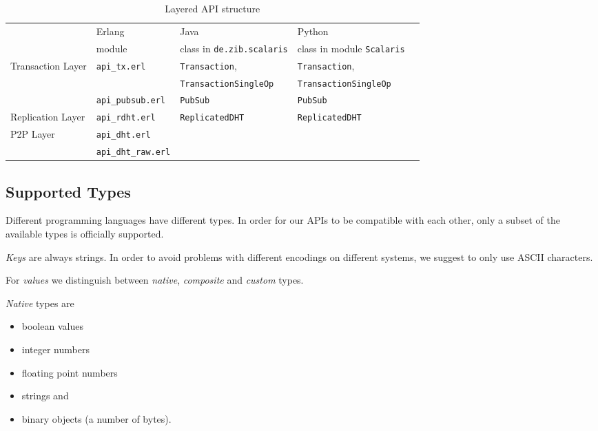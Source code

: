 \documentclass[a4paper]{scrreprt}
\newcommand{\code}[1]{\lstinline[basicstyle=\ttfamily]!#1!}
\begin{document}
\begin{table}
  \centering
    \begin{tabular}{lllll}
    \toprule
                      & Erlang                 & Java                         & Python                     \\
                      & \footnotesize{module}  & \footnotesize{class in \code{de.zib.scalaris}}%
                                                                              & \footnotesize{class in module \code{Scalaris}} \\
    \midrule
    Transaction Layer & \code{api_tx.erl}      & \code{Transaction},          & \code{Transaction},        \\
                      &                        & \code{TransactionSingleOp}  & \code{TransactionSingleOp} \\
                      & \code{api_pubsub.erl}  & \code{PubSub}                & \code{PubSub}              \\
    \cmidrule(lr){1-4}
    Replication Layer & \code{api_rdht.erl}    & \code{ReplicatedDHT}         & \code{ReplicatedDHT}       \\
    \cmidrule(lr){1-4}
    P2P Layer         & \code{api_dht.erl}     &                              &                            \\
                      & \code{api_dht_raw.erl} &                              &                            \\
    \bottomrule
    \end{tabular}
    \caption{Layered API structure}
    \label{api.layers}
\end{table}

\subsection{Supported Types}

Different programming languages have different types. In order for our APIs
to be compatible with each other, only a subset of the available types is
officially supported.

\emph{Keys} are always strings. In order to avoid problems with different
encodings on different systems, we suggest to only use ASCII characters.

For \emph{values} we distinguish between \emph{native}, \emph{composite}
and \emph{custom} types.

\emph{Native} types are
\begin{itemize}
  \item boolean values
  \item integer numbers
  \item floating point numbers
  \item strings and
  \item binary objects (a number of bytes).
\end{itemize}
\end{document}
